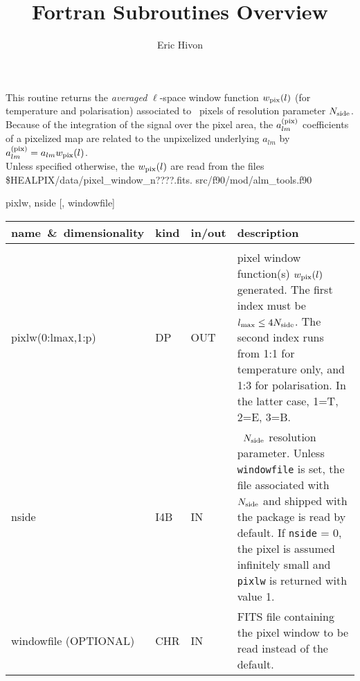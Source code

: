 
\sloppy


\title{\healpix Fortran Subroutines Overview}
 \section[pixel\_window]{ }
\label{sub:pixel_window}
\author{Eric Hivon}

\newcommand{\wpix}{w_{\rm pix}(\ell)}
\newcommand{\alm}{a_{lm}}
\newcommand{\almpix}{a_{lm}^{\rm (pix)}}

\begin{facility}
{This routine returns the {\em averaged} $\ell$-space window function $\wpix$ (for temperature and
  polarisation) associated to \healpix\
  pixels of resolution parameter ${N_{\rm side}}$. Because of the integration of the
signal over the
pixel area, the $\almpix$ coefficients of a pixelized map
are related to the unpixelized underlying $\alm$ by $\almpix = \alm \wpix$.\\
Unless specified otherwise, the $\wpix$ are read from the files
  \$HEALPIX/data/pixel\_window\_n????.fits.}
{src/f90/mod/alm\_tools.f90}
\end{facility}

\begin{f90format}
{pixlw, nside [, windowfile]}
\end{f90format}

\begin{arguments}
{
\begin{tabular}{p{0.30\hsize} p{0.05\hsize} p{0.05\hsize} p{0.50\hsize}} \hline  
\textbf{name~\&~dimensionality} & \textbf{kind} & \textbf{in/out} & \textbf{description} \\ \hline
                   &   &   &                           \\ %
pixlw(0:lmax,1:p) & DP & OUT & pixel window function(s) $\wpix$ generated. The first index
                   must be $l_{\rm max}\leq 4{N_{\rm side}}$. The second index runs from 1:1 for
                   temperature only, and 1:3 for polarisation. In the latter
                   case, 1=T, 2=E, 3=B.\\
nside & I4B & IN & \healpix\ ${N_{\rm side}}$ resolution parameter. Unless {\tt
                   windowfile} is set, the file associated
                   with ${N_{\rm side}}$ and shipped with the package is read by
                   default. If {\tt nside} = 0, the pixel is assumed infinitely
                   small and {\tt pixlw} is returned with value 1.\\
windowfile \hskip 2cm
(OPTIONAL) & CHR & IN & FITS file containing the pixel window to be read instead
                   of the default.
\end{tabular}
}
\end{arguments}


